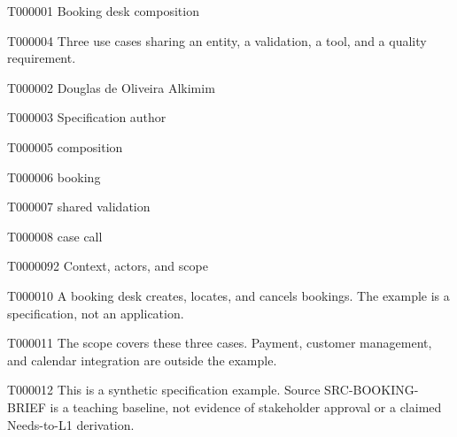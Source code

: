 \documentclass[11pt,a4paper]{article}
\begin{document}
\begin{atlastitle}{T000001}
Booking desk composition
\end{atlastitle}
\begin{atlastext}{T000004}
Three use cases sharing an entity, a validation, a tool, and a quality requirement.
\end{atlastext}
\AtlasEndCover
{}
\begin{atlasitem}{T000002}
Douglas de Oliveira Alkimim
\end{atlasitem}
\begin{atlastext}{T000003}
Specification author
\end{atlastext}
\begin{atlasitem}{T000005}
composition
\end{atlasitem}
\begin{atlasitem}{T000006}
booking
\end{atlasitem}
\begin{atlasitem}{T000007}
shared validation
\end{atlasitem}
\begin{atlasitem}{T000008}
case call
\end{atlasitem}
\begin{atlasheading}{T000009}{2}
Context, actors, and scope
\end{atlasheading}
\begin{atlasparagraph}{T000010}
A booking desk creates, locates, and cancels bookings. The example is a specification, not an application.
\end{atlasparagraph}
\begin{atlasparagraph}{T000011}
The scope covers these three cases. Payment, customer management, and calendar integration are outside the example.
\end{atlasparagraph}
\begin{atlasparagraph}{T000012}
This is a synthetic specification example. Source SRC-BOOKING-BRIEF is a teaching baseline, not evidence of stakeholder approval or a claimed Needs-to-L1 derivation.
\end{atlasparagraph}
\end{document}
